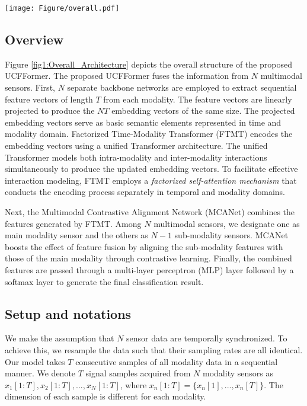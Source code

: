 \begin{figure*}[tbh]
    \centering
    \texttt{[image: Figure/overall.pdf]}
    \caption{\textbf{Overall Architecture} : The proposed UCFFormer first represents each raw multimodal data in a shared feature space. FTMT encodes these embedding features, capturing their dependencies within the time-modality domain using the Unified Transformer. Subsequently, MCANet refines these embeddings by aligning them across modalities through contrastive learning. These enhanced embeddings are then aggregated, leading to the final classification results.}
    \label{fig1:Overall_Architecture}
\end{figure*}

\subsection{Overview}
Figure \ref{fig1:Overall_Architecture} depicts the overall structure of the proposed UCFFormer. The proposed UCFFormer fuses the information from $N$ multimodal sensors. First, $N$ separate backbone networks are employed to extract sequential feature vectors of length $T$ from each modality. The feature vectors are linearly projected to produce the $NT$ embedding vectors of the same size. The projected embedding vectors serve as basic semantic elements represented in time and modality domain.
Factorized Time-Modality Transformer (FTMT) encodes the embedding vectors using a unified Transformer architecture. The unified Transformer models both intra-modality and inter-modality interactions simultaneously to produce the updated embedding vectors. To facilitate effective interaction modeling, FTMT employs a {\it factorized self-attention mechanism} that conducts the encoding process separately in temporal and modality domains.

Next, the Multimodal Contrastive Alignment Network (MCANet) combines the features generated by FTMT.
Among $N$ multimodal sensors, we designate one as main modality sensor and the others as $N-1$ sub-modality sensors. MCANet boosts the effect of feature fusion by aligning the sub-modality features with those of the main modality through contrastive learning. Finally, the combined features are passed through a multi-layer perceptron (MLP) layer followed by a softmax layer to generate the final classification result.

\subsection{Setup and notations}
We make the assumption that $N$ sensor data are temporally synchronized. To achieve this, we resample the data such that their sampling rates are all identical. Our model takes $T$ consecutive samples of all modality data in a sequential manner. We denote $T$ signal samples acquired from $N$ modality sensors as $x_{1}[1:T], x_{2}[1:T],..., x_{N}[1:T]$, where $x_{n}[1:T]=\{x_{n}[1],..., x_{n}[T]\}$. The dimension of each sample is different for each modality. 

